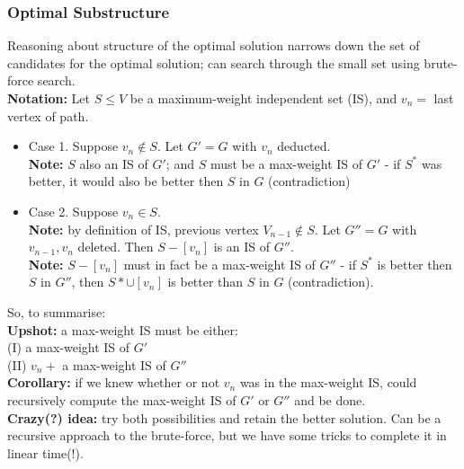 \documentclass{scrartcl}
\begin{document}
\subsubsection{Optimal Substructure}
\label{sec:8-2}
Reasoning about structure of the optimal solution narrows down the set of
candidates for the optimal solution; can search through the small set using
brute-force search.\\
{\bf Notation: } Let $S \leq V$ be a maximum-weight independent set (IS), and
$v_n = $ last vertex of path.
\begin{itemize}
\item Case 1. Suppose $v_n \notin S$. Let $G' = G$ with $v_n$ deducted.\\
{\bf Note: } $S$ also an IS of $G'$; and $S$ must be a max-weight IS of $G'$ -
if $S^*$ was better, it would also be better then $S$ in $G$ (contradiction)
\item Case 2. Suppose $v_n \in S$. \\
{\bf Note: } by definition of IS, previous vertex $V_{n-1} \notin S$. Let $G'' =
G$ with $v_{n-1}, v_n$ deleted. Then $S - [v_n]$ is an IS of $G''$.\\
{\bf Note: } $S - [v_n]$ must in fact be a max-weight IS of $G''$ - if $S^*$ is
better then $S$ in $G''$, then $S* \cup [v_n]$ is better than $S$ in $G$
(contradiction). 
\end{itemize}
So, to summarise:\\
{\bf Upshot: } a max-weight IS must be either:\\
(I) a max-weight IS of $G'$\\
(II) $v_n + $ a max-weight IS of $G''$\\
{\bf Corollary: } if we knew whether or not $v_n$ was in the max-weight IS, could
recursively compute the max-weight IS of $G'$ or $G''$ and be done.\\
{\bf Crazy(?) idea: } try both possibilities and retain the better solution. Can
be a recursive approach to the brute-force, but we have some tricks to complete
it in linear time(!).

\end{document}
